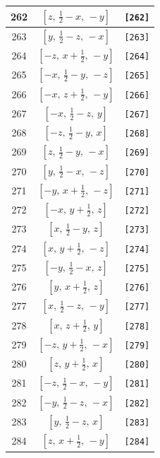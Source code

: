 \documentclass[fleqn,8pt]{jsarticle}
\begin{document}
\begin{longtable}{ccc}
262 & $\left[ z,\, \frac{1}{2} - x,\, - y \right]$ & {\tt [262]} \\ \hline
263 & $\left[ y,\, \frac{1}{2} - z,\, - x \right]$ & {\tt [263]} \\ \hline
264 & $\left[ - z,\, x + \frac{1}{2},\, - y \right]$ & {\tt [264]} \\ \hline
265 & $\left[ - x,\, \frac{1}{2} - y,\, - z \right]$ & {\tt [265]} \\ \hline
266 & $\left[ - x,\, z + \frac{1}{2},\, - y \right]$ & {\tt [266]} \\ \hline
267 & $\left[ - x,\, \frac{1}{2} - z,\, y \right]$ & {\tt [267]} \\ \hline
268 & $\left[ - z,\, \frac{1}{2} - y,\, x \right]$ & {\tt [268]} \\ \hline
269 & $\left[ z,\, \frac{1}{2} - y,\, - x \right]$ & {\tt [269]} \\ \hline
270 & $\left[ y,\, \frac{1}{2} - x,\, - z \right]$ & {\tt [270]} \\ \hline
271 & $\left[ - y,\, x + \frac{1}{2},\, - z \right]$ & {\tt [271]} \\ \hline
272 & $\left[ - x,\, y + \frac{1}{2},\, z \right]$ & {\tt [272]} \\ \hline
273 & $\left[ x,\, \frac{1}{2} - y,\, z \right]$ & {\tt [273]} \\ \hline
274 & $\left[ x,\, y + \frac{1}{2},\, - z \right]$ & {\tt [274]} \\ \hline
275 & $\left[ - y,\, \frac{1}{2} - x,\, z \right]$ & {\tt [275]} \\ \hline
276 & $\left[ y,\, x + \frac{1}{2},\, z \right]$ & {\tt [276]} \\ \hline
277 & $\left[ x,\, \frac{1}{2} - z,\, - y \right]$ & {\tt [277]} \\ \hline
278 & $\left[ x,\, z + \frac{1}{2},\, y \right]$ & {\tt [278]} \\ \hline
279 & $\left[ - z,\, y + \frac{1}{2},\, - x \right]$ & {\tt [279]} \\ \hline
280 & $\left[ z,\, y + \frac{1}{2},\, x \right]$ & {\tt [280]} \\ \hline
281 & $\left[ - z,\, \frac{1}{2} - x,\, - y \right]$ & {\tt [281]} \\ \hline
282 & $\left[ - y,\, \frac{1}{2} - z,\, - x \right]$ & {\tt [282]} \\ \hline
283 & $\left[ y,\, \frac{1}{2} - z,\, x \right]$ & {\tt [283]} \\ \hline
284 & $\left[ z,\, x + \frac{1}{2},\, - y \right]$ & {\tt [284]} \\ \hline

\end{longtable}
\end{document}
